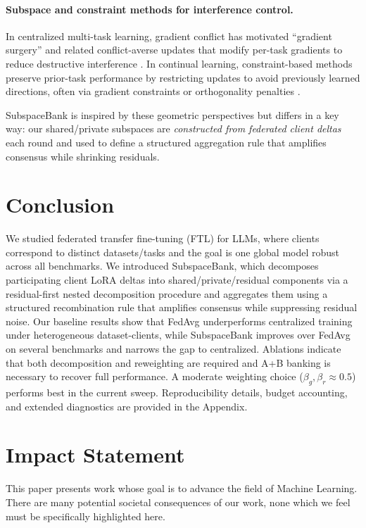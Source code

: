 \documentclass{article}
\theoremstyle{plain}
\theoremstyle{definition}
\theoremstyle{remark}
\begin{document}
\paragraph{Subspace and constraint methods for interference control.}
In centralized multi-task learning, gradient conflict has motivated “gradient surgery” and related conflict-averse updates that modify per-task gradients to reduce destructive interference
\citet{yu2020pcgrad,liu2021cagrad}.
In continual learning, constraint-based methods preserve prior-task performance by restricting updates to avoid previously learned directions, often via gradient constraints or orthogonality penalties
\citet{lopezpaz2017gem,chaudhry2018agem,farajtabar2020ogd}.

SubspaceBank is inspired by these geometric perspectives but differs in a key way: our shared/private subspaces are \emph{constructed from federated client deltas} each round and used to define a structured aggregation rule that amplifies consensus while shrinking residuals.





\section{Conclusion}
\label{sec:conclusion}

We studied federated transfer fine-tuning (FTL) for LLMs, where clients correspond to distinct datasets/tasks and the goal is one global model robust across all benchmarks. We introduced SubspaceBank, which decomposes participating client LoRA deltas into shared/private/residual components via a residual-first nested decomposition procedure and aggregates them using a structured recombination rule that amplifies consensus while suppressing residual noise. Our baseline results show that FedAvg underperforms centralized training under heterogeneous dataset-clients, while SubspaceBank improves over FedAvg on several benchmarks and narrows the gap to centralized. Ablations indicate that both decomposition and reweighting are required and A+B banking is necessary to recover full performance. A moderate weighting choice ($\beta_g,\beta_r \approx 0.5$) performs best in the current sweep. Reproducibility details, budget accounting, and extended diagnostics are provided in the Appendix.


\section*{Impact Statement}
This paper presents work whose goal is to advance the field of Machine
Learning. There are many potential societal consequences of our work, none
which we feel must be specifically highlighted here.
\end{document}
